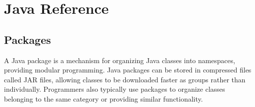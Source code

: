 \pagestyle{pippo}
\chapter{Java Reference}


%
%
%

\section{Packages}\label{sec:package}
A Java package is a mechanism for organizing Java classes into namespaces, providing modular programming. Java packages can be stored in compressed files called JAR files, allowing classes to be downloaded faster as groups rather than individually. Programmers also typically use packages to organize classes belonging to the same category or providing similar functionality.

